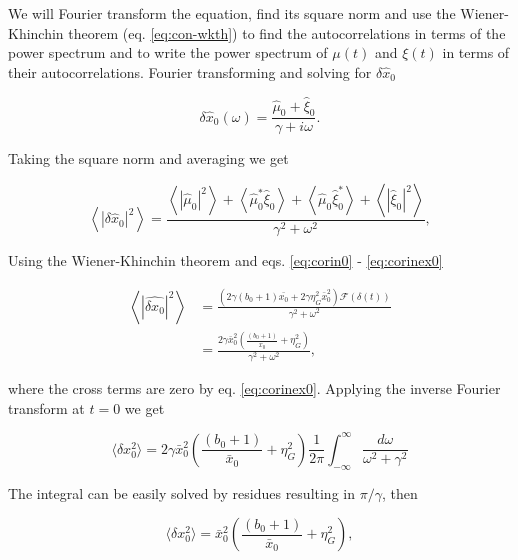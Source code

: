We will Fourier transform the equation, find its square norm and use the Wiener-Khinchin theorem (eq. \eqref{eq:con-wkth}) to find the autocorrelations in terms of the power spectrum and to write the power spectrum of $\mu(t)$ and $\xi(t)$ in terms of their autocorrelations. Fourier transforming and solving for $\delta \hat{x}_0$

\begin{equation}
\label{eq:fgene0}
\delta \hat{x}_0(\omega) = \frac{\hat{\mu}_0+\hat{\xi}_0}{\gamma + i\omega}.
\end{equation}

Taking the square norm and averaging we get

\begin{equation*}
\left\langle |\delta \hat{x}_0|^2 \right\rangle = \frac{\left\langle|\hat{\mu}_0|^2\right\rangle + \left\langle\hat{\mu}_0^*\hat{\xi}_0\right\rangle+\left\langle\hat{\mu}_0\hat{\xi}_0^*\right\rangle+\left\langle|\hat{\xi}_0|^2\right\rangle}{\gamma^2 + \omega^2},
\end{equation*}

Using the Wiener-Khinchin theorem and eqs. \eqref{eq:corin0} - \eqref{eq:corinex0}

\begin{equation}
  \label{eq:pgene0}
  \begin{split}
    \left\langle |\hat{\delta x_0}|^2 \right\rangle &= \frac{\left(2\gamma(b_0+1)\bar{x_0}+ 2\gamma\eta_G^2\bar{x}_0^2\right)\mathscr{F}(\delta(t))}{\gamma^2+\omega^2}\\
    &=\frac{2\gamma\bar{x}_0^2\left(\frac{(b_0+1)}{\bar{x}_0}+ \eta_G^2\right)}{\gamma^2+\omega^2},
  \end{split}
\end{equation}

where the cross terms are zero by eq. \eqref{eq:corinex0}. Applying the inverse Fourier transform at $t=0$ we get

\begin{equation*}
\langle \delta x_0^2 \rangle = 2\gamma\bar{x}_0^2\left(\frac{(b_0+1)}{\bar{x}_0}+ \eta_G^2\right)\frac{1}{2\pi}\int_{-\infty}^{\infty}\frac{d\omega}{\omega^2+\gamma^2}
\end{equation*}

The integral can be easily solved by residues resulting in $\pi/\gamma$, then

\begin{equation*}
\langle \delta x_0^2 \rangle = \bar{x}_0^2\left(\frac{(b_0+1)}{\bar{x}_0}+ \eta_G^2\right),
\end{equation*}

